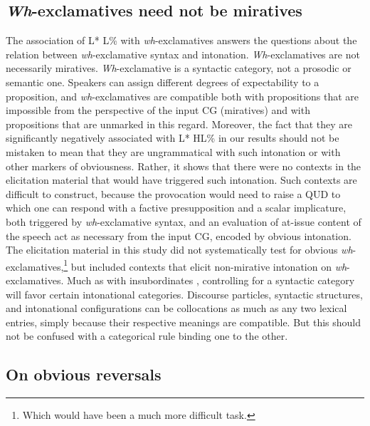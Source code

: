 \subsection{\textit{Wh}-exclamatives need not be miratives}\label{ch:6.3.2}

The association of L* L\% with \textit{wh}-exclamatives answers the questions about the relation between \textit{wh}-exclamative syntax and intonation. \textit{Wh}-exclamatives are not necessarily miratives. \textit{Wh}-exclamative is a syntactic category, not a prosodic or semantic one. Speakers can assign different degrees of expectability to a proposition, and \textit{wh}-exclamatives are compatible both with propositions that are impossible from the perspective of the input \ac{CG} (miratives) and with propositions that are unmarked in this regard. Moreover, the fact that they are significantly negatively associated with L* HL\% in our results should not be mistaken to mean that they are ungrammatical with such intonation or with other markers of obviousness. Rather, it shows that there were no contexts in the elicitation material that would have triggered such intonation. Such contexts are difficult to construct, because the provocation would need to raise a \ac{QUD} to which one can respond with a factive presupposition and a scalar implicature, both triggered by \textit{wh}-exclamative syntax, and an evaluation of at-issue content of the speech act as necessary from the input \ac{CG}, encoded by obvious intonation. The elicitation material in this study did not systematically test for obvious \textit{wh}-exclamatives,\footnote{Which would have been a much more difficult task.} but included contexts that elicit non-mirative intonation on \textit{wh}-exclamatives. Much as with insubordinates \citep{ElviraGarcia.2016}, controlling for a syntactic category will favor certain intonational categories. Discourse particles, syntactic structures, and intonational configurations can be collocations as much as any two lexical entries, simply because their respective meanings are compatible. But this should not be confused with a categorical rule binding one to the other.

\subsection{On obvious reversals}\label{ch:6.3.3}

